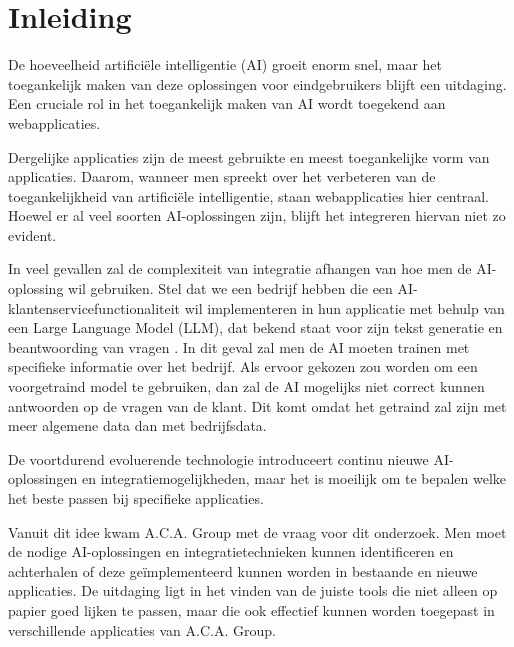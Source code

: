 \documentclass[dutch]{hogent-article}
\begin{document}

\section{Inleiding}%
\label{sec:Introduction}


De hoeveelheid artificiële intelligentie (AI) groeit enorm snel, maar het toegankelijk maken van deze oplossingen voor eindgebruikers blijft een uitdaging. Een cruciale rol in het toegankelijk maken van AI wordt toegekend aan webapplicaties.
  \setlength{\parskip}{1em}
  
  Dergelijke applicaties zijn de meest gebruikte en meest toegankelijke vorm van applicaties.\linebreak
  Daarom, wanneer men spreekt over het verbeteren van de toegankelijkheid van artificiële intelligentie, staan webapplicaties hier centraal. Hoewel er al veel soorten AI-oplossingen zijn, blijft het integreren hiervan niet zo evident.
  
  In veel gevallen zal de complexiteit van integratie afhangen van hoe men de AI-oplossing wil gebruiken. Stel dat we een bedrijf hebben die een AI-klantenservicefunctionaliteit wil implementeren in hun applicatie met behulp van een Large Language Model (LLM), dat bekend staat voor zijn tekst generatie en beantwoording van vragen \autocite{Zhang2023}. In dit geval zal men de AI moeten trainen met specifieke informatie over het bedrijf. Als ervoor gekozen zou worden om een voorgetraind model te gebruiken, dan zal de AI mogelijks niet correct kunnen antwoorden op de vragen van de klant. Dit komt omdat het getraind zal zijn met meer algemene data dan met bedrijfsdata.
  
  De voortdurend evoluerende technologie introduceert continu nieuwe AI-oplossingen en integratiemogelijkheden, maar het is moeilijk om te bepalen welke het beste passen bij specifieke applicaties. 
  
  Vanuit dit idee kwam A.C.A. Group met de vraag voor dit onderzoek. Men moet de nodige AI-oplossingen en integratietechnieken kunnen identificeren en achterhalen of deze geïmplementeerd kunnen worden in bestaande en nieuwe applicaties. De uitdaging ligt in het vinden van de juiste tools die niet alleen op papier goed lijken te passen, maar die ook effectief kunnen worden toegepast in verschillende applicaties van A.C.A. Group. 
  
\end{document}
